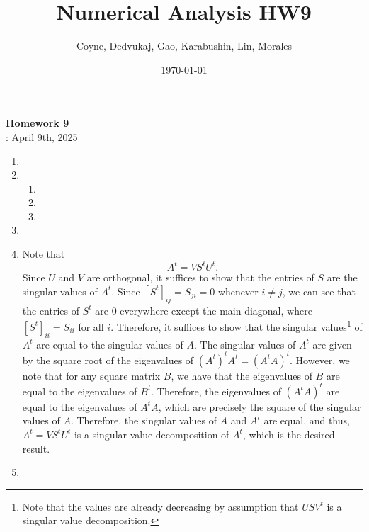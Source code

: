 \documentclass[12pt]{article}
\title{Numerical Analysis HW9}
\author{Coyne, Dedvukaj, Gao, Karabushin, Lin, Morales}
\date{\today}
\begin{document}
\pagestyle{fancy}


\begin{center}
\textbf{\Large Homework 9} \\
: April 9th, 2025
\end{center}

\begin{enumerate}[leftmargin=0em]
    \item 

    \item
    \begin{enumerate}[leftmargin=!]
        \item 

        \item 

        \item

    \end{enumerate}

    \item

    \item
    Note that
    \[A^{t} = VS^{t}U^{t}.\]
    Since $U$ and $V$ are orthogonal, it suffices to show that the entries of $S$ are the singular values of $A^{t}$. Since ${[S^{t}]}_{ij} = S_{ji} = 0$ whenever $i\neq j$, we can see that the entries of $S^{t}$ are $0$ everywhere except the main diagonal, where ${[S^{t}]}_{ii} = S_{ii}$ for all $i$. Therefore, 
    it suffices to show that the singular values\footnote{Note that the values are already decreasing by assumption that $USV^{t}$ is a singular value decomposition.} of $A^{t}$ are equal to the singular values of $A$. The singular values of $A^{t}$ are given by the square root of the eigenvalues of ${(A^{t})}^{t}A^{t} = {(A^{t}A)}^{t}$. However, we note that for any square matrix $B$, we have that the eigenvalues of $B$ are equal to the eigenvalues of $B^{t}$. Therefore, the eigenvalues of ${(A^{t}A)}^{t}$ are equal to the eigenvalues of
    $A^{t}A$, which are precisely the square of the singular values of $A$. Therefore, the singular values of $A$ and $A^{t}$ are equal, and thus, $A^{t} = VS^{t}U^{t}$ is a singular value decomposition of $A^{t}$, which is the desired result.

    \item 


\end{enumerate}
\end{document}
